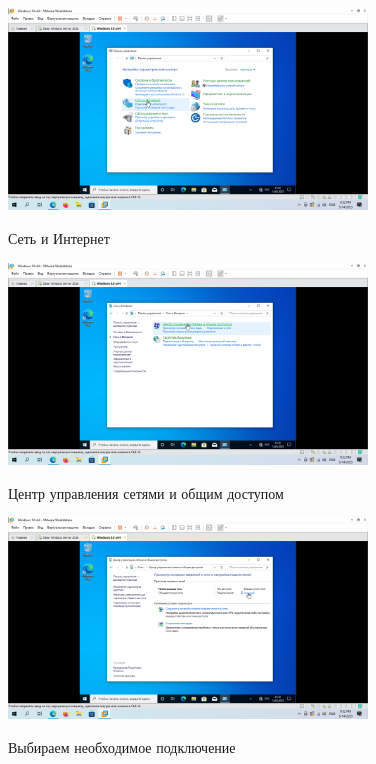\documentclass[a4paper]{article}
\begin{document}
  \begin{figure}[H]
    \centering
    \includegraphics[width=0.85\textwidth]{5_0061}
    \label{img:61}
    \caption{Сеть и Интернет}
  \end{figure}

  \begin{figure}[H]
    \centering
    \includegraphics[width=0.85\textwidth]{5_0062}
    \label{img:62}
    \caption{Центр управления сетями и общим доступом}
  \end{figure}

  \begin{figure}[H]
    \centering
    \includegraphics[width=0.85\textwidth]{5_0064}
    \label{img:64}
    \caption{Выбираем необходимое подключение}
  \end{figure}
\end{document}
